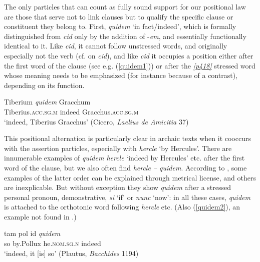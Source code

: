 The only particles that can count as fully sound support for our positional law are those that serve not to link clauses but to qualify the specific clause or constituent they belong to. First, \emph{quidem} `in fact/indeed', which is formally distinguished from  \emph{cid} only by the addition of -\emph{em}, and essentially functionally identical to it. Like \emph{cid}, it cannot follow unstressed words, and originally especially not the verb (cf. \citealp[73]{Bartholomae1888} on \emph{cid}), and like \emph{cid} it occupies a position either after the first word of the clause (see e.g. (\ref{quidem1})) or after the \hyperlink{p418}{\emph{[p418]}} stressed word whose meaning needs to be emphasized (for instance because of a contrast), depending on its function.

\begin{exe}
\ex
\gll Tiberium \emph{quidem} Gracchum\\
Tiberius.\textsc{acc.sg.m} indeed Gracchus.\textsc{acc.sg.m}\\
\trans `indeed, Tiberius Gracchus' (Cicero, \textit{Laelius de Amicitia} 37) 
\label{quidem1}
\end{exe}

This positional alternation is particularly clear in archaic texts when it cooccurs with the assertion particles, especially with \emph{hercle} `by Hercules'. There are innumerable examples of \emph{quidem hercle} `indeed by Hercules' etc. after the first word of the clause, but we also often find \emph{hercle -- quidem}. According to \citet[64f.]{Kellerhoff1891}, some examples of the latter order can be explained through metrical license, and others are inexplicable. But without exception they show \emph{quidem} after a stressed personal pronoun, demonstrative, \emph{si} `if' or \emph{nunc} `now': in all these cases, \emph{quidem} is attached to the orthotonic word following \emph{hercle} etc. (Also (\ref{quidem2}), an example not found in \citealp{Kellerhoff1891}.)

\begin{exe}
\ex
\gll tam pol id \emph{quidem}\\
so by.Pollux he.\textsc{nom.sg.n} indeed\\
\trans `indeed, it [is] so' (Plautus, \textit{Bacchides} 1194) 
\label{quidem2}
\end{exe}

